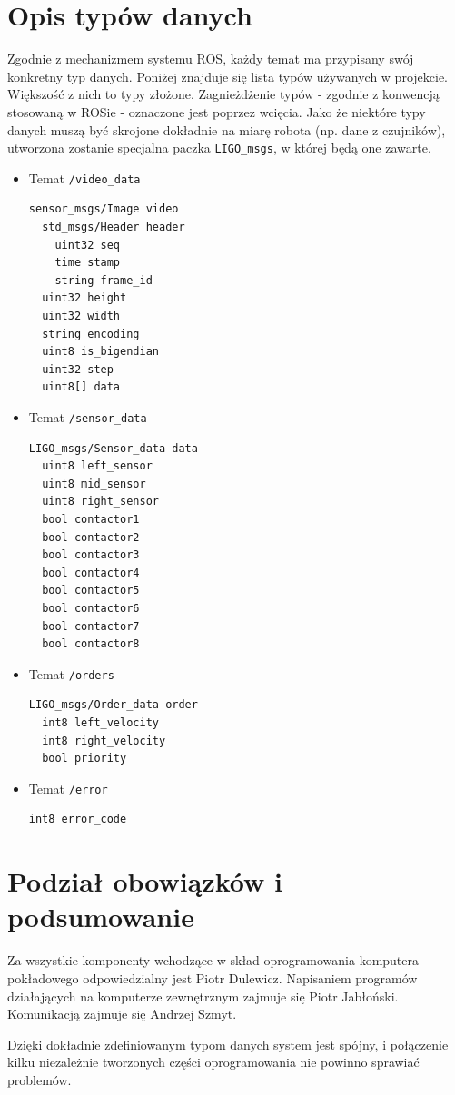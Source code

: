 \documentclass[a4paper]{article}
\begin{document}
\section{Opis typów danych} \label{opis_typow}

Zgodnie z mechanizmem systemu ROS, każdy temat ma przypisany swój konkretny typ danych. Poniżej znajduje się lista typów używanych w projekcie. Większość z nich to typy złożone. Zagnieżdżenie typów - zgodnie z konwencją stosowaną w ROSie - oznaczone jest poprzez wcięcia. Jako że niektóre typy danych muszą być skrojone dokładnie na miarę robota (np. dane z czujników), utworzona zostanie specjalna paczka \verb|LIGO_msgs|, w której będą one zawarte. 

\begin{itemize}

\item Temat \verb|/video_data|
\begin{verbatim}
sensor_msgs/Image video
  std_msgs/Header header
    uint32 seq
    time stamp
    string frame_id
  uint32 height
  uint32 width
  string encoding
  uint8 is_bigendian
  uint32 step
  uint8[] data
\end{verbatim}

\item Temat \verb|/sensor_data|
\begin{verbatim}
LIGO_msgs/Sensor_data data
  uint8 left_sensor
  uint8 mid_sensor
  uint8 right_sensor
  bool contactor1
  bool contactor2
  bool contactor3
  bool contactor4
  bool contactor5
  bool contactor6
  bool contactor7
  bool contactor8
\end{verbatim}

\item Temat \verb|/orders|
\begin{verbatim}
LIGO_msgs/Order_data order
  int8 left_velocity
  int8 right_velocity
  bool priority
\end{verbatim}

\item Temat \verb|/error|
\begin{verbatim}
int8 error_code
\end{verbatim}

\end{itemize}

\section{Podział obowiązków i podsumowanie}

Za wszystkie komponenty wchodzące w skład oprogramowania komputera pokładowego odpowiedzialny jest Piotr Dulewicz. Napisaniem programów działających na komputerze zewnętrznym zajmuje się Piotr Jabłoński. Komunikacją zajmuje się Andrzej Szmyt. 

Dzięki dokładnie zdefiniowanym typom danych system jest spójny, i połączenie kilku niezależnie tworzonych części oprogramowania nie powinno sprawiać problemów.
\end{document}
